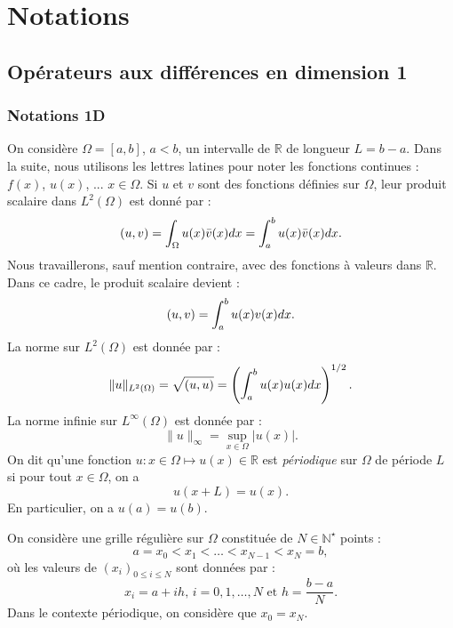 \chapter{Notations}

\section{Opérateurs aux différences en dimension 1}

\subsection{Notations 1D}
\label{sec:notation_1D}

On considère $\Omega = [a,b]$, $a<b$, un intervalle de $\mathbb{R}$ de longueur $L=b-a$. Dans la suite, nous utilisons les lettres latines pour noter les fonctions continues : $f(x)$, $u(x)$, ... $x \in \Omega$. Si $u$ et $v$ sont des fonctions définies sur $\Omega$, leur produit scalaire dans $L^2 ( \Omega )$ est donné par :
\begin{equation}
(u,v) = \displaystyle\int_{\Omega} u(x) \bar{v}(x) dx = \displaystyle\int_{a}^b u(x) \bar{v}(x) dx.
\end{equation}
Nous travaillerons, sauf mention contraire, avec des fonctions à valeurs dans $\mathbb{R}$. Dans ce cadre, le produit scalaire devient :
\begin{equation}
(u,v) = \displaystyle\int_{a}^b u(x) v(x) dx.
\end{equation}
La norme sur $L^2(\Omega)$ est donnée par :
\begin{equation}
\| u \|_{L^2(\Omega)} = \sqrt{(u,u)} = \left( \displaystyle\int_{a}^b u(x) u(x) dx \right)^{1/2}.
\end{equation}
La norme infinie sur $L^{\infty}(\Omega)$ est donnée par :
\begin{equation}
\| u \|_{\infty} = \sup_{x\in\Omega} |u(x)|.
\end{equation}
On dit qu'une fonction $u : x \in \Omega \mapsto u(x) \in \mathbb{R}$ est \textit{périodique} sur $\Omega$ de période $L$ si pour tout $x \in \Omega$, on a 
\begin{equation}
u(x+L) = u(x).
\end{equation}
En particulier, on a $u(a)=u(b)$.

On considère une grille régulière sur $\Omega$ constituée de $N \in \mathbb{N}^{\star}$ points :
\begin{equation}
a=x_0 < x_1 < \ldots < x_{N-1} < x_N = b,
\end{equation}
où les valeurs de $(x_i)_{0\leq i \leq N}$ sont données par :
\begin{equation}
x_i = a + ih\text{, } i = 0,1, \ldots,N \text{ et } h = \dfrac{b-a}{N}. 
\end{equation}
 Dans le contexte périodique, on considère que $x_0 = x_N$.

